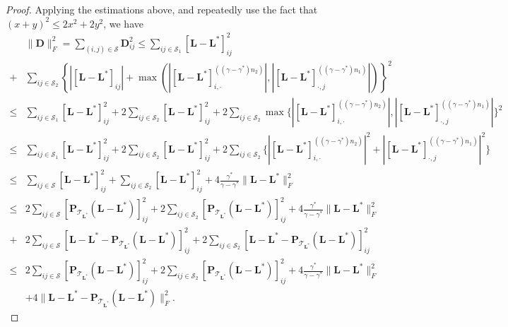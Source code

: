 \documentclass[12pt]{article}
\newcommand{\bL}{\boldsymbol{L}}
\newcommand{\bP}{\boldsymbol{P}}
\newcommand{\bD}{\boldsymbol{D}}
\def\bS{\boldsymbol{S}}
\def\bP{\boldsymbol{P}}
\theoremstyle{plain}
\theoremstyle{definition}
\theoremstyle{plain}
\theoremstyle{plain}
\theoremstyle{remark}
\begin{document}
\begin{proof}
Applying the estimations above, and repeatedly use the fact that $(x+y)^2\leq 2x^2+2y^2$, we have
\begin{align}\nonumber
&\|\bD\|_F^2=\sum_{(i,j)\in\mathcal{S}}\bD_{ij}^2\leq \sum_{ij\in \mathcal{S}_1}[\bL-\bL^*]_{ij}^2%
\\\nonumber+&\sum_{ij\in \mathcal{S}_2}\left\{|[\bL-\bL^*]_{ij}|+\max(|[\bL-\bL^*]_{i,\cdot}^{((\gamma-\gamma^*) n_2)}|, |[\bL-\bL^*]_{\cdot,j}^{((\gamma-\gamma^*) n_1)}|)\right\}^2\\\nonumber
\leq & \sum_{ij\in \mathcal{S}_1}[\bL-\bL^*]_{ij}^2+2\sum_{ij\in \mathcal{S}_2}[\bL-\bL^*]_{ij}^2+2\sum_{ij\in \mathcal{S}_2}\max\{|[\bL-\bL^*]_{i,\cdot}^{((\gamma-\gamma^*) n_2)}|, |[\bL-\bL^*]_{\cdot,j}^{((\gamma-\gamma^*) n_1)}|\}^2\\\nonumber
\leq & \sum_{ij\in \mathcal{S}_1}[\bL-\bL^*]_{ij}^2+2\sum_{ij\in \mathcal{S}_2}[\bL-\bL^*]_{ij}^2+2\sum_{ij\in \mathcal{S}_2}\{|[\bL-\bL^*]_{i,\cdot}^{((\gamma-\gamma^*) n_2)}|^2 + |[\bL-\bL^*]_{\cdot,j}^{((\gamma-\gamma^*) n_1)}|^2\}\\\nonumber
\leq & \sum_{ij\in \mathcal{S}}[\bL-\bL^*]_{ij}^2+\sum_{ij\in \mathcal{S}_2}[\bL-\bL^*]_{ij}^2+4\frac{\gamma^*}{\gamma-\gamma^*}\|\bL-\bL^*\|_F^2\\\nonumber
\leq & 2\sum_{ij\in \mathcal{S}}[\bP_{\mathcal{T}_{\bL^*}}(\bL-\bL^*)]_{ij}^2+2\sum_{ij\in \mathcal{S}_2}[\bP_{\mathcal{T}_{\bL^*}}(\bL-\bL^*)]_{ij}^2+4\frac{\gamma^*}{\gamma-\gamma^*}\|\bL-\bL^*\|_F^2 \\\nonumber+&
2\sum_{ij\in \mathcal{S}}[\bL-\bL^*-\bP_{\mathcal{T}_{\bL^*}}(\bL-\bL^*)]_{ij}^2+2\sum_{ij\in \mathcal{S}_2}[\bL-\bL^*-\bP_{\mathcal{T}_{\bL^*}}(\bL-\bL^*)]_{ij}^2
\\\nonumber\leq & 2\sum_{ij\in \mathcal{S}}[\bP_{\mathcal{T}_{\bL^*}}(\bL-\bL^*)]_{ij}^2+2\sum_{ij\in \mathcal{S}_2}[\bP_{\mathcal{T}_{\bL^*}}(\bL-\bL^*)]_{ij}^2+4\frac{\gamma^*}{\gamma-\gamma^*}\|\bL-\bL^*\|_F^2 \\&+ 4 \|\bL-\bL^*-\bP_{\mathcal{T}_{\bL^*}}(\bL-\bL^*)\|_F^2.\label{eq:estimation1}
\end{align}


\end{proof}
\end{document}
